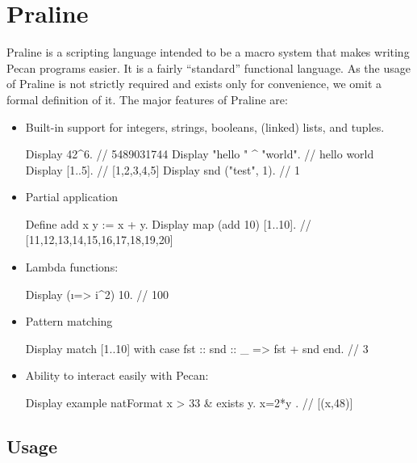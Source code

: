 \section{Praline}\label{sec:praline}

Praline is a scripting language intended to be a macro system that makes writing Pecan programs easier.
It is a fairly ``standard'' functional language.
As the usage of Praline is not strictly required and exists only for convenience, we omit a formal definition of it.
The major features of Praline are:

\begin{itemize}
    \item Built-in support for integers, strings, booleans, (linked) lists, and tuples.
    
\begin{pecan}
Display 42^6. // 5489031744
Display "hello " ^ "world". // hello world
Display [1..5]. // [1,2,3,4,5]
Display snd ("test", 1). // 1
\end{pecan}
    
    \item Partial application
    
\begin{pecan}
Define add x y := x + y.
Display map (add 10) [1..10]. // [11,12,13,14,15,16,17,18,19,20]
\end{pecan}
    
    \item Lambda functions:
\begin{pecan}
Display (\i => i^2) 10. // 100
\end{pecan}
    
    \item Pattern matching
\begin{pecan}
Display match [1..10] with 
        case fst :: snd :: _ => fst + snd 
        end. // 3
\end{pecan}
        
    \item Ability to interact easily with Pecan:
\begin{pecan}
Display example natFormat { x > 33 & exists y. x=2*y }. // [(x,48)]
\end{pecan}

\end{itemize}

\subsection{Usage}

